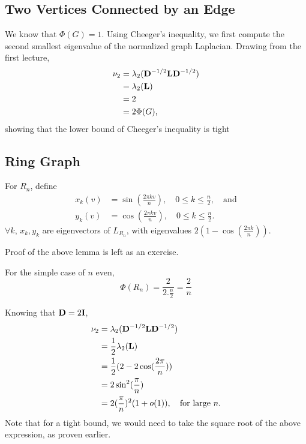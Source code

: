\documentclass[11pt]{article}
\begin{document}
\subsection{Two Vertices Connected by an Edge}
We know that $\Phi(G)=1$. Using Cheeger's inequality, we first compute the second smallest eigenvalue of the normalized graph Laplacian. Drawing from the first lecture,
\begin{align*}
\nu_2 &= \lambda_2(\V{D}^{-1/2}\V{L}\V{D}^{-1/2})\\
&= \lambda_2(\V{L}) \\
&= 2 \\
&= 2\Phi(G),
\end{align*}
showing that the lower bound of Cheeger's inequality is tight

\subsection{Ring Graph}

\begin{lemma}
For $R_n$, define
\begin{align*}
x_k(v) &= \sin(\frac{2\pi kv}{n}), \quad 0 \leq k \leq \frac{n}{2}, \quad \mathrm{and} \\
y_k(v) &= \cos(\frac{2\pi kv}{n}), \quad 0 \leq k \leq \frac{n}{2}.
\end{align*}
$\forall k$, $x_k, y_k$ are eigenvectors of $L_{R_n}$, with eigenvalues $2(1-\cos(\frac{2\pi k}{n}))$.
\end{lemma}

Proof of the above lemma is left as an exercise.

For the simple case of $n$ even,
\begin{equation*}
\Phi(R_n) = \dfrac{2}{2.\frac{n}{2}} = \dfrac{2}{n}
\end{equation*}

Knowing that $\V{D}=2\V{I}$,
\begin{align*}
\nu_2 &= \lambda_2(\V{D}^{-1/2}\V{L}\V{D}^{-1/2}) \\
&= \frac{1}{2}\lambda_2(\V{L}) \\
&= \frac{1}{2} (2-2\cos (\dfrac{2\pi}{n})) \\
&= 2 \sin^2(\dfrac{\pi}{n}) \\
&= 2 (\dfrac{\pi}{n})^2(1+o(1)), \quad \text{for large $n$}.
\end{align*}
Note that for a tight bound, we would need to take the square root of the above expression, as proven earlier. 
\end{document}
